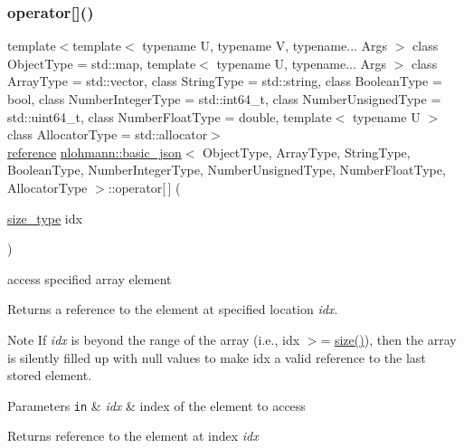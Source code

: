 \subsubsection{\texorpdfstring{operator[]()}{operator[]()}\hspace{0.1cm}{\footnotesize\ttfamily [1/10]}}
{\footnotesize\ttfamily template$<$template$<$ typename U, typename V, typename... Args $>$ class Object\+Type = std\+::map, template$<$ typename U, typename... Args $>$ class Array\+Type = std\+::vector, class String\+Type  = std\+::string, class Boolean\+Type  = bool, class Number\+Integer\+Type  = std\+::int64\+\_\+t, class Number\+Unsigned\+Type  = std\+::uint64\+\_\+t, class Number\+Float\+Type  = double, template$<$ typename U $>$ class Allocator\+Type = std\+::allocator$>$ \\
\hyperlink{classnlohmann_1_1basic__json_a3ec8e17be8732fe436e9d6733f52b7a3}{reference} \hyperlink{classnlohmann_1_1basic__json}{nlohmann\+::basic\+\_\+json}$<$ Object\+Type, Array\+Type, String\+Type, Boolean\+Type, Number\+Integer\+Type, Number\+Unsigned\+Type, Number\+Float\+Type, Allocator\+Type $>$\+::operator\mbox{[}$\,$\mbox{]} (\begin{DoxyParamCaption}\item[{\hyperlink{classnlohmann_1_1basic__json_a1579a8f72a230358d6cd1a6e8a62859b}{size\+\_\+type}}]{idx }\end{DoxyParamCaption})\hspace{0.3cm}{\ttfamily [inline]}}



access specified array element 

Returns a reference to the element at specified location {\itshape idx}.

\begin{DoxyNote}{Note}
If {\itshape idx} is beyond the range of the array (i.\+e., {\ttfamily idx $>$= \hyperlink{classnlohmann_1_1basic__json_a0ea8a1ecca4b3cb0ba09ad7552c364b6}{size()}}), then the array is silently filled up with {\ttfamily null} values to make {\ttfamily idx} a valid reference to the last stored element.
\end{DoxyNote}

\begin{DoxyParams}[1]{Parameters}
\mbox{\tt in}  & {\em idx} & index of the element to access\\
\hline
\end{DoxyParams}
\begin{DoxyReturn}{Returns}
reference to the element at index {\itshape idx} 
\end{DoxyReturn}

